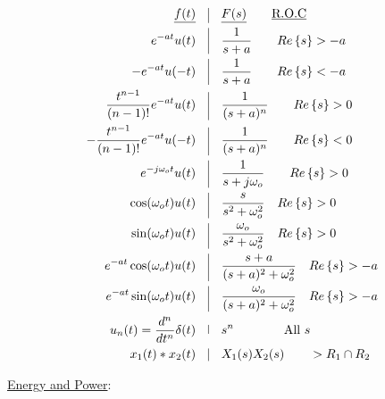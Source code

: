 \begin{multicols}{2}
\begin{equation*}
  \begin{split}
    \underline{f(t)}\quad&\vline\quad\underline{F(s)}\quad\quad \text{\underline{R.O.C}}\\
    e^{-at}u(t)\quad&\vline\quad \frac{1}{s+a}\quad\quad Re\left\{ s \right\}>-a\\
    -e^{-at}u(-t)\quad&\vline\quad \frac{1}{s+a}\quad\quad Re\left\{ s \right\}<-a\\
    \frac{t^{n-1}}{(n-1)!}e^{-at}u(t)\quad&\vline\quad \frac{1}{(s+a)^n}\quad\quad Re\left\{ s \right\}>0\\
    -\frac{t^{n-1}}{(n-1)!}e^{-at}u(-t)\quad&\vline\quad \frac{1}{(s+a)^n}\quad\quad Re\left\{ s \right\}<0\\
    e^{-j\omega_ot}u(t)\quad&\vline\quad \frac{1}{s+j\omega_o}\quad\quad Re\left\{ s \right\}>0\\
    \cos(\omega_ot)u(t)\quad&\vline\quad \frac{s}{s^2+\omega_o^2}\quad Re\left\{ s \right\}>0\\
    \sin(\omega_ot)u(t)\quad&\vline\quad \frac{\omega_o}{s^2+\omega_o^2}\quad Re\left\{ s \right\}>0\\
    e^{-at}\cos(\omega_ot)u(t)\quad&\vline\quad \frac{s+a}{(s+a)^2+\omega_o^2}\quad Re\left\{ s \right\}>-a\\
    e^{-at}\sin(\omega_ot)u(t)\quad&\vline\quad \frac{\omega_o}{(s+a)^2+\omega_o^2}\quad Re\left\{ s \right\}>-a\\
    u_n(t)=\frac{d^n}{dt^n}\delta(t)\quad&\vline\quad s^n\quad\quad\quad\quad \text{All }s\\
    x_1(t)*x_2(t) \quad&\vline\quad X_1(s)X_2(s)\quad\quad > R_1\cap R_2
  \end{split}
  \label{6}
  \end{equation*}

\end{multicols}

  \begin{center}
    \underline{Energy and Power}:
  \end{center}

  \vspace{-30pt}

